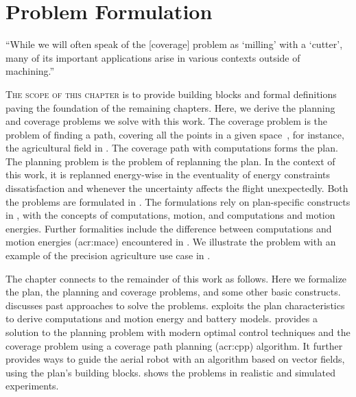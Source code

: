 
%
%
%
%
\chapter{Problem Formulation}
\label{cp:pb}

\begin{chapquote}{\cite{arkin2001optimal}}
  ``While we will often speak of the [coverage] problem as `milling' with a `cutter', many of its important applications arise in various contexts outside of machining.''
\end{chapquote}

\vspace*{1em}

\lettrine{T}{he scope of this chapter} is to provide building blocks and formal definitions paving the foundation of the remaining chapters. Here, we derive the planning and coverage problems we solve with this work. The coverage problem is the problem of finding a path, covering all the points in a given space~\citep{choset2001coverage,galceran2013survey}, for instance, the agricultural field in . The coverage path with computations forms the plan. The planning problem is the problem of replanning the plan. In the context of this work, it is replanned energy-wise in the eventuality of energy constraints dissatisfaction and whenever the uncertainty affects the flight unexpectedly. Both the problems are formulated in . The formulations rely on plan-specific constructs in , with the concepts of computations, motion, and computations and motion energies. Further formalities include the difference between computations and motion energies (\Gls{acr:mace}) encountered in . We illustrate the problem with an example of the precision agriculture use case in .

The chapter connects to the remainder of this work as follows. Here we formalize the plan, the planning and coverage problems, and some other basic constructs.  discusses past approaches to solve the problems.  exploits the plan characteristics to derive computations and motion energy and battery models.  provides a solution to the planning problem with modern optimal control techniques and the coverage problem using a coverage path planning (\Gls{acr:cpp}) algorithm. It further provides ways to guide the aerial robot with an algorithm based on vector fields, using the plan's building blocks.  shows the problems in realistic and simulated experiments.


